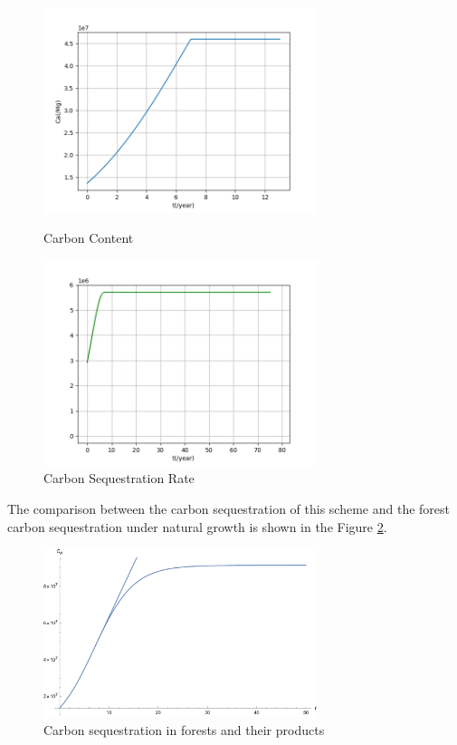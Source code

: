 \documentclass[12pt]{article}
\begin{document}
\begin{figure}[hp!]
    \centering
    \begin{minipage}{8cm}
        \centering
        \includegraphics[width=8cm]{05Ca.png}
        \caption{Carbon Content}\label{05Ca}
    \end{minipage}
    \qquad
    \begin{minipage}{8cm}
        \centering
        \includegraphics[width=8cm]{05Ca2.png}
        \caption{Carbon Sequestration Rate}\label{05Ca'}
    \end{minipage}
\end{figure}
The comparison between the carbon sequestration of this scheme and the forest carbon sequestration under natural growth is shown in the Figure \ref{025}.
\begin{figure}[hp!]
    \centering
    \includegraphics[width=8cm]{025.pdf}
    \caption{Carbon sequestration in forests and their products}
    \label{025}
\end{figure}
\end{document}
